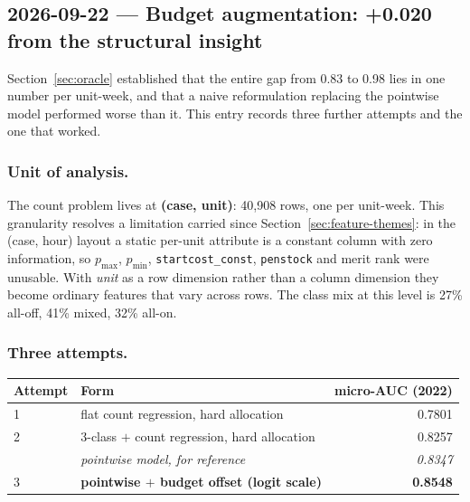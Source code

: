 \subsection{2026-09-22 --- Budget augmentation: +0.020 from the structural insight}
\label{sec:budget}

Section~\ref{sec:oracle} established that the entire gap from 0.83 to 0.98 lies in one number per
unit-week, and that a naive reformulation replacing the pointwise model performed worse than it.
This entry records three further attempts and the one that worked.

\subsubsection*{Unit of analysis.}
The count problem lives at \textbf{(case, unit)}: 40{,}908 rows, one per unit-week. This
granularity resolves a limitation carried since Section~\ref{sec:feature-themes}: in the
(case, hour) layout a static per-unit attribute is a constant column with zero information, so
$p_{\max}$, $p_{\min}$, \texttt{startcost\_const}, \texttt{penstock} and merit rank were unusable.
With \emph{unit} as a row dimension rather than a column dimension they become ordinary features
that vary across rows. The class mix at this level is 27\% all-off, 41\% mixed, 32\% all-on.

\subsubsection*{Three attempts.}

\begin{center}
\begin{tabular}{llr}
\toprule
Attempt & Form & micro-AUC (2022) \\
\midrule
1 & flat count regression, hard allocation      & 0.7801 \\
2 & 3-class $+$ count regression, hard allocation & 0.8257 \\
  & \emph{pointwise model, for reference}       & \emph{0.8347} \\
3 & \textbf{pointwise $+$ budget offset (logit scale)} & \textbf{0.8548} \\
\bottomrule
\end{tabular}
\end{center}


